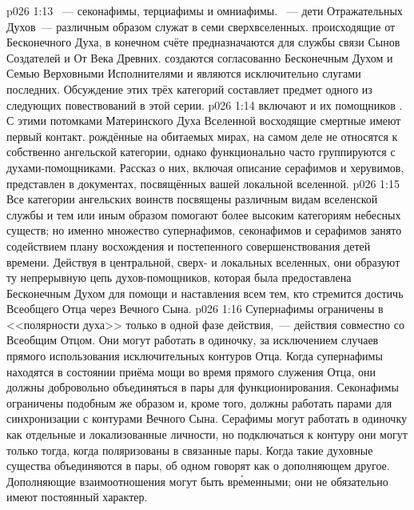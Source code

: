 \vs p026 1:13 ~--- секонафимы, терциафимы и омниафимы. ~--- дети Отражательных Духов~--- различным образом служат в семи сверхвселенных.  происходящие от Бесконечного Духа, в конечном счёте предназначаются для службы связи Сынов Создателей и От Века Древних.  создаются согласованно Бесконечным Духом и Семью Верховными Исполнителями и являются исключительно слугами последних. Обсуждение этих трёх категорий составляет предмет одного из следующих повествований в этой серии.
\vs p026 1:14  включают  и их помощников . С этими потомками Материнского Духа Вселенной восходящие смертные имеют первый контакт.  рождённые на обитаемых мирах, на самом деле не относятся к собственно ангельской категории, однако функционально часто группируются с духами\hyp{}помощниками. Рассказ о них, включая описание серафимов и херувимов, представлен в документах, посвящённых вашей локальной вселенной.
\vs p026 1:15 \pc Все категории ангельских воинств посвящены различным видам вселенской службы и тем или иным образом помогают более высоким категориям небесных существ; но именно множество супернафимов, секонафимов и серафимов занято содействием плану восхождения и постепенного совершенствования детей времени. Действуя в центральной, сверх\hyp{} и локальных вселенных, они образуют ту непрерывную цепь духов\hyp{}помощников, которая была предоставлена Бесконечным Духом для помощи и наставления всем тем, кто стремится достичь Всеобщего Отца через Вечного Сына.
\vs p026 1:16 Супернафимы ограничены в <<полярности духа>> только в одной фазе действия,~--- действия совместно со Всеобщим Отцом. Они могут работать в одиночку, за исключением случаев прямого использования исключительных контуров Отца. Когда супернафимы находятся в состоянии приёма мощи во время прямого служения Отца, они должны добровольно объединяться в пары для функционирования. Секонафимы ограничены подобным же образом и, кроме того, должны работать парами для синхронизации с контурами Вечного Сына. Серафимы могут работать в одиночку как отдельные и локализованные личности, но подключаться к контуру они могут только тогда, когда поляризованы в связанные пары. Когда такие духовные существа объединяются в пары, об одном говорят как о дополняющем другое. Дополняющие взаимоотношения могут быть вр\'еменными; они не обязательно имеют постоянный характер.
